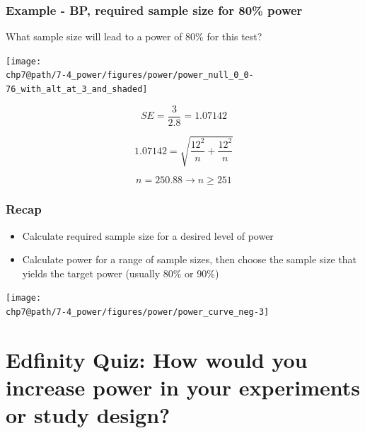 \documentclass[slidestop,compress,mathserif]{beamer}
\makeatletter
\def\chp7@path{../../Chp 7}
\makeatother
\begin{document}

\begin{frame}
\frametitle{Example - BP, required sample size for 80\% power}

{\dq
{\footnotesize
What sample size will lead to a power of 80\% for this test?
}}

\pause

\texttt{[image: \\chp7@path/7-4\_power/figures/power/power\_null\_0\_0-76\_with\_alt\_at\_3\_and\_shaded]}

\pause

\[ SE = \frac{3}{2.8} = 1.07142 \]

\pause

\[ 1.07142 = \sqrt{ \frac{12^2}{n} + \frac{12^2}{n} } \]

\pause

\[ n = 250.88 \rightarrow n \ge 251 \]

\end{frame}


\begin{frame}
\frametitle{Recap}

\begin{itemize}
\item Calculate required sample size for a desired level of power
\item Calculate power for a range of sample sizes, then choose the sample size that yields the target power (usually 80\% or 90\%)
\end{itemize}
\begin{center}
\texttt{[image: \\chp7@path/7-4\_power/figures/power/power\_curve\_neg-3]}
\end{center}

\end{frame}


\section{Edfinity Quiz: How would you increase power in your experiments or study design?}  %

\end{document}
